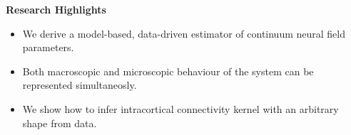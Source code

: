 \documentclass[]{article}
\begin{document}
\textbf{Research Highlights}
\begin{itemize}
	\item We derive a model-based, data-driven estimator of continuum neural field parameters.
	\item Both macroscopic and microscopic behaviour of the system can be represented simultaneosly.
	\item We show how to infer intracortical connectivity kernel with an arbitrary shape from data.
\end{itemize}
\end{document}
